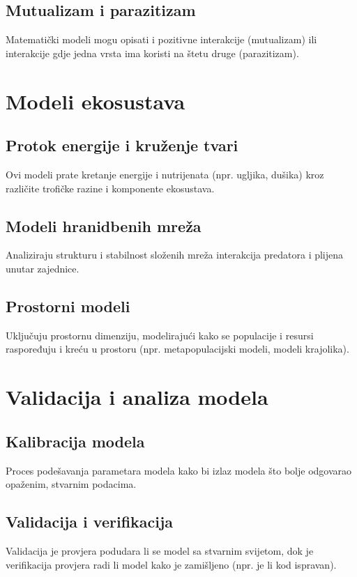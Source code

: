 \documentclass[12pt, a4paper]{book}
\begin{document}
	\section{Mutualizam i parazitizam}
	Matematički modeli mogu opisati i pozitivne interakcije (mutualizam) ili interakcije gdje jedna vrsta ima koristi na štetu druge (parazitizam).
	
	\chapter{Modeli ekosustava}
	\section{Protok energije i kruženje tvari}
	Ovi modeli prate kretanje energije i nutrijenata (npr. ugljika, dušika) kroz različite trofičke razine i komponente ekosustava.
	
	\section{Modeli hranidbenih mreža}
	Analiziraju strukturu i stabilnost složenih mreža interakcija predatora i plijena unutar zajednice.
	
	\section{Prostorni modeli}
	Uključuju prostornu dimenziju, modelirajući kako se populacije i resursi raspoređuju i kreću u prostoru (npr. metapopulacijski modeli, modeli krajolika).
	
	\chapter{Validacija i analiza modela}
	\section{Kalibracija modela}
	Proces podešavanja parametara modela kako bi izlaz modela što bolje odgovarao opaženim, stvarnim podacima.
	
	\section{Validacija i verifikacija}
	Validacija je provjera podudara li se model sa stvarnim svijetom, dok je verifikacija provjera radi li model kako je zamišljeno (npr. je li kod ispravan).
	
\end{document}
